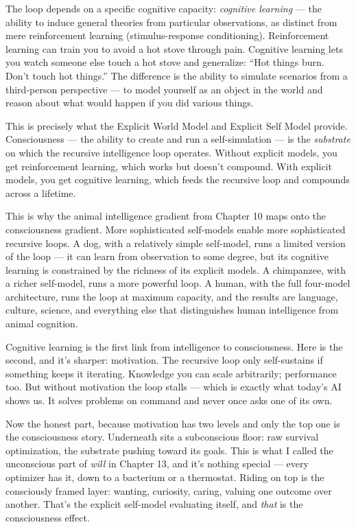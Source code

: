 \documentclass[11pt, twoside, openright]{book}
\begin{document}
The loop depends on a specific cognitive capacity: \textit{cognitive learning} --- the ability to induce general theories from particular observations, as distinct from mere reinforcement learning (stimulus-response conditioning). Reinforcement learning can train you to avoid a hot stove through pain. Cognitive learning lets you watch someone else touch a hot stove and generalize: ``Hot things burn. Don't touch hot things.'' The difference is the ability to simulate scenarios from a third-person perspective --- to model yourself as an object in the world and reason about what would happen if you did various things.

This is precisely what the Explicit World Model and Explicit Self Model provide. Consciousness --- the ability to create and run a self-simulation --- is the \textit{substrate} on which the recursive intelligence loop operates. Without explicit models, you get reinforcement learning, which works but doesn't compound. With explicit models, you get cognitive learning, which feeds the recursive loop and compounds across a lifetime.

This is why the animal intelligence gradient from Chapter 10 maps onto the consciousness gradient. More sophisticated self-models enable more sophisticated recursive loops. A dog, with a relatively simple self-model, runs a limited version of the loop --- it can learn from observation to some degree, but its cognitive learning is constrained by the richness of its explicit models. A chimpanzee, with a richer self-model, runs a more powerful loop. A human, with the full four-model architecture, runs the loop at maximum capacity, and the results are language, culture, science, and everything else that distinguishes human intelligence from animal cognition.

Cognitive learning is the first link from intelligence to consciousness. Here is the second, and it's sharper: motivation. The recursive loop only self-sustains if something keeps it iterating. Knowledge you can scale arbitrarily; performance too. But without motivation the loop stalls --- which is exactly what today's AI shows us. It solves problems on command and never once asks one of its own.

Now the honest part, because motivation has two levels and only the top one is the consciousness story. Underneath sits a subconscious floor: raw survival optimization, the substrate pushing toward its goals. This is what I called the unconscious part of \textit{will} in Chapter 13, and it's nothing special --- every optimizer has it, down to a bacterium or a thermostat. Riding on top is the consciously framed layer: wanting, curiosity, caring, valuing one outcome over another. That's the explicit self-model evaluating itself, and \textit{that} is the consciousness effect.
\end{document}
